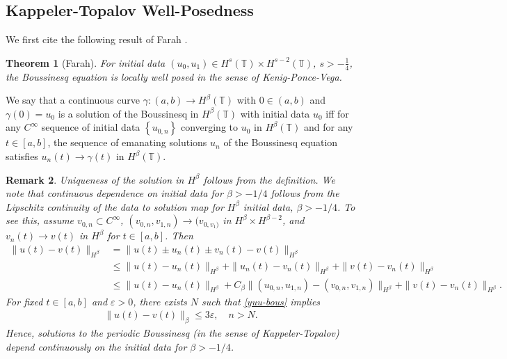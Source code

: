 \documentclass[12pt,reqno]{amsart}
\numberwithin{equation}{section}  %
\newcommand{\ci}{\mathbb{T}}
\newcommand{\ee}{\varepsilon}
\newtheorem{theorem}{Theorem}[section]
\newtheorem{remark}[theorem]{Remark}
\begin{document}
  \subsection{Kappeler-Topalov \cite{Kappeler:2006uq} Well-Posedness} 
  \label{ssec:kap-wp-bous}
  We first cite the following result of Farah \cite{Farah:2010ys}. 
  \begin{theorem}[Farah]
    For initial data $(u_{0}, u_{1}) \in H^{s}(\ci) \times H^{s-2}(\ci)$,
    $s > -\frac{1}{4}$, the Boussinesq equation is locally well posed in the sense
    of Kenig-Ponce-Vega. 
    \label{thm:farah}
  \end{theorem}
  We say that a continuous curve $\gamma: (a,b) \to H^{\beta}(\ci)$ with $0 \in
  (a,b)$ and $\gamma(0) = u_{0}$ is a solution of the Boussinesq in
  $H^{\beta}(\ci)$ with initial data $u_{0}$ iff for any $C^{\infty}$ sequence
  of initial data $\left\{ u_{0,n} \right\}$ converging to $u_{0}$ in
  $H^{\beta}(\ci)$ and for any $t \in [a,b]$, the sequence of emanating
  solutions $u_{n}$ of the Boussinesq equation satisfies $u_{n}(t) \to
  \gamma(t)$ in $H^{\beta}(\ci)$.
 \begin{framed}
  \begin{remark}
    Uniqueness of the solution in $H^{\beta}$ follows from the definition. We
    note that continuous dependence on initial data for $\beta > -1/4$ follows
    from the Lipschitz continuity of the data to solution map for $H^{\beta}$
    initial data, $\beta > -1/4$. To see this, assume $v_{0,n} \subset C^{\infty}$,
    $(v_{0,n}, v_{1,n}) \to (v_{0, v_{1})}$ in $H^{\beta} \times H^{\beta-2}$,
    and $v_{n}(t) \to v(t)$ in $H^{\beta}$ for
  $t \in [a,b]$. Then
  \begin{equation}
    \label{yuu-bous}
  \begin{split}
    \|u(t) - v(t) \|_{H^{\beta}} 
    & = \|u(t) \pm u_{n}(t) \pm v_{n}(t) - v(t) \|_{H^{\beta}}
    \\
    & \le \| u(t) - u_{n}(t) \|_{H^{\beta}} + \| u_{n}(t) - v_{n}(t) \|_{H^{\beta}} + \|
    v(t) -
    v_{n}(t) \|_{H^{\beta}}
    \\
    & \le \| u(t) - u_{n}(t) \|_{H^{\beta}} + C_{\beta} \| (u_{0,n},
    u_{1,n}) - (v_{0,n}, v_{1,n})\|_{H^{\beta}} + \| v(t) -
    v_{n}(t) \|_{H^{\beta}}.
  \end{split}
  \end{equation}
  For fixed $t \in [a,b]$ and $\ee > 0$, there exists $N$ such that
  \eqref{yuu-bous} implies
  \begin{equation*}
  \begin{split}
  \|u(t) - v(t) \|_{\beta} \le 3 \ee, \quad n > N.
     \end{split}
  \end{equation*}
  Hence, solutions to the periodic Boussinesq (in the sense of Kappeler-Topalov) depend
  continuously on the initial data for $\beta > -1/4$.
  \label{rem:uniqueness-bous}
  \end{remark}
  \end{framed}
\end{document}
